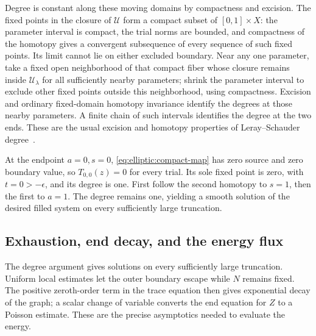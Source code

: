 Degree is constant along these moving domains by compactness and excision.
The fixed points in the closure of $\mathcal U$ form a compact subset of
$[0,1]\times X$: the parameter interval is compact, the trial norms
are bounded, and compactness of the homotopy gives a convergent
subsequence of every sequence of such fixed points.  Its limit cannot lie on either excluded boundary.  Near any one parameter, take a fixed open
neighborhood of that compact fiber whose closure remains inside
$\mathcal U_\lambda$ for all sufficiently nearby parameters; shrink
the parameter interval to exclude other fixed points outside this
neighborhood, using compactness.  Excision and ordinary fixed-domain
homotopy invariance identify the degrees at those nearby parameters.
A finite chain of such intervals identifies the degree at the two
ends.  These are the usual excision and homotopy properties of
Leray--Schauder degree~\cite[Chapter~2]{Deimling1985}.

At the endpoint $a=0,s=0$, \eqref{eq:elliptic:compact-map}
has zero source and zero boundary value, so $T_{0,0}(z)=0$ for every
trial.  Its sole fixed point is zero, with $t=0>-\epsilon$, and its
degree is one.  First follow the second homotopy to $s=1$, then the
first to $a=1$.  The degree remains one, yielding a smooth solution
of the desired filled system on every sufficiently large truncation.

\subsection{Exhaustion, end decay, and the energy flux}

The degree argument gives solutions on every sufficiently large
truncation.  Uniform local estimates let the outer boundary escape
while $N$ remains fixed.  The positive zeroth-order term in the trace
equation then gives exponential decay of the graph; a scalar change
of variable converts the end equation for $Z$ to a Poisson estimate.
These are the precise asymptotics needed to evaluate the energy.

